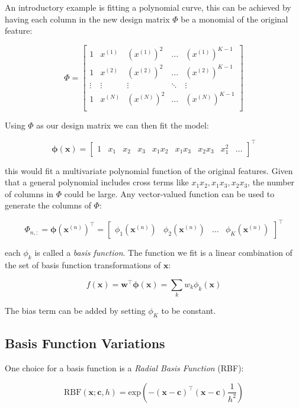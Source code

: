 \documentclass{article}
\begin{document}
An introductory example is fitting a polynomial curve, this can be achieved by having each column in the new design matrix $\Phi$ be a monomial of the original feature:

\[
\Phi =
\begin{bmatrix}
           1 & x^{(1)} & (x^{(1)})^2 & \dots & (x^{(1)})^{K-1} \\
           1 & x^{(2)} & (x^{(2)})^2 & \dots & (x^{(2)})^{K-1} \\
           \vdots & \vdots & \vdots & \ddots & \vdots \\
           1 & x^{(N)} & (x^{(N)})^2 & \dots & (x^{(N)})^{K-1} \\
\end{bmatrix}
\]

Using $\Phi$ as our design matrix we can then fit the model:

\[
\pmb{\phi}(\mathbf{x}) =
\begin{bmatrix}
	1 & x_1 & x_2 & x_3 & x_1x_2 & x_1x_3 & x_2x_3 & x_1^2 & \dots
\end{bmatrix}^\top
\]

this would fit a multivariate polynomial function of the original features.
Given that a general polynomial includes cross terms like $x_1x_2, x_1x_3, x_2x_3$, the number of columns in $\Phi$ could be large. Any vector-valued function can be used to generate the columns of $\Phi$:

\[
\Phi_{n,:} = \pmb{\phi}(\mathbf{x}^{(n)})^\top =
\begin{bmatrix}
\phi_1(\mathbf{x}^{(n)}) & \phi_2(\mathbf{x}^{(n)}) & \dots & \phi_K(\mathbf{x}^{(n)})
\end{bmatrix}^\top
\]

each $\phi_k$ is called a \emph{basis function}. The function we fit is a linear combination of the set of basis function transformations of $\mathbf{x}$:

\[
f(\mathbf{x}) = \mathbf{w}^\top \pmb{\phi}(\mathbf{x}) = \sum_k w_k \phi_k (\mathbf{x})
\]

The bias term can be added by setting $\phi_K$ to be constant.

\subsection{Basis Function Variations}

One choice for a basis function is a \emph{Radial Basis Function} (RBF):

\[
\text{RBF}(\mathbf{x};\mathbf{c},h) = \text{exp}(-(\mathbf{x} - \mathbf{c})^\top(\mathbf{x}-\mathbf{c}) \frac{1}{h^2})
\]
\end{document}
